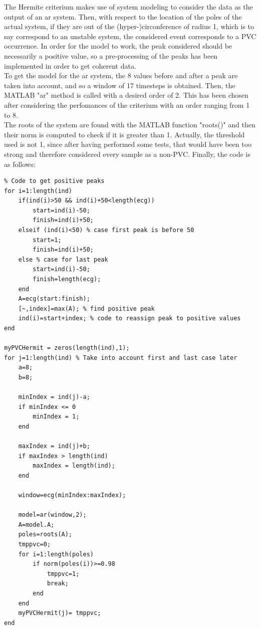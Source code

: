 \documentclass[a4paper,titlepage]{article}
\begin{document}
The Hermite criterium makes use of system modeling to consider the data as the output of an ar system. Then, with respect to the location of  the poles of the actual system, if they are out of the (hyper-)circonference of radius 1, which is to say correspond to an unstable system, the considered event corresponds to a PVC occurrence.
In order for the model to work, the peak considered should be necessarily a positive value, so a pre-processing of the peaks has been implemented in order to get coherent data.\\
To get the model for the ar system, the 8 values before and after a peak are taken into account, and so a window of 17 timesteps is obtained. Then, the MATLAB "ar" method is called with a desired order of 2. This has been chosen after considering the perfomances of the criterium with an order ranging from 1 to 8.\\
The roots of the system are found with the MATLAB function "roots()" and then their norm is computed to check if it is greater than 1. Actually, the threshold used is not 1, since after having performed some tests, that would have been too strong and therefore considered every sample as a non-PVC.
Finally, the code is as follows:
\begin{lstlisting}[caption=Hermite criterium]
% hermite
% Code to get positive peaks
for i=1:length(ind)
    if(ind(i)>50 && ind(i)+50<length(ecg))
        start=ind(i)-50;
        finish=ind(i)+50;        
    elseif (ind(i)<50) % case first peak is before 50
        start=1;
        finish=ind(i)+50;
    else % case for last peak
        start=ind(i)-50;
        finish=length(ecg);
    end 
    A=ecg(start:finish); 
    [~,index]=max(A); % find positive peak
    ind(i)=start+index; % code to reassign peak to positive values
end

myPVCHermit = zeros(length(ind),1);
for j=1:length(ind) % Take into account first and last case later
    a=8;
    b=8;
    
    minIndex = ind(j)-a;
    if minIndex <= 0
        minIndex = 1;
    end
    
    maxIndex = ind(j)+b;
    if maxIndex > length(ind)
        maxIndex = length(ind);
    end
    
    window=ecg(minIndex:maxIndex);

    model=ar(window,2);
    A=model.A;
    poles=roots(A);
    tmppvc=0;
    for i=1:length(poles)
        if norm(poles(i))>=0.98
            tmppvc=1;
            break;
        end
    end
    myPVCHermit(j)= tmppvc;
end

\end{lstlisting}
\end{document}
